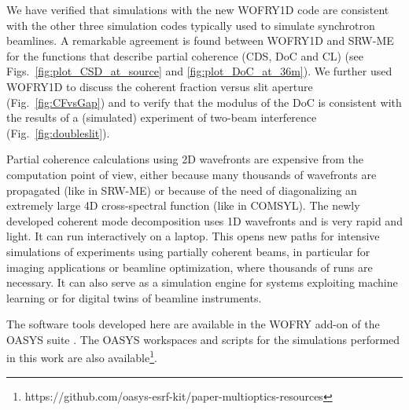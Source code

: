 \documentclass{iucr}
\newcommand{\inblue}[1]{{\color{blue}#1}}
\begin{document}
We have verified that simulations with the new WOFRY1D code are consistent with the other three simulation codes typically used to simulate synchrotron beamlines.
A remarkable agreement is found between WOFRY1D and SRW-ME for the functions that describe partial coherence (CDS, DoC and CL) (see Figs.~\ref{fig:plot_CSD_at_source} and \ref{fig:plot_DoC_at_36m}).
We further used WOFRY1D to discuss the coherent fraction versus slit aperture (\inblue{Fig.~\ref{fig:CFvsGap}}) and to verify that the modulus of the DoC is consistent with the results of a (simulated) experiment of two-beam interference (\inblue{Fig.~\ref{fig:doubleslit}}). 
 
Partial coherence calculations using 2D wavefronts are expensive from the computation point of view, either because many thousands of wavefronts are propagated (like in SRW-ME) or because of the need of diagonalizing an extremely large 4D cross-spectral function (like in COMSYL). The newly developed coherent mode decomposition uses 1D wavefronts and is very rapid and light. It can run interactively on a laptop. This opens new paths for intensive simulations of experiments using partially coherent beams, in particular for imaging applications or beamline optimization, where thousands of runs are necessary. It can also serve as a simulation engine for systems exploiting machine learning or for digital twins of beamline instruments. 
 
The software tools developed here are available in the WOFRY add-on of the OASYS suite \cite{codeOASYS}. The OASYS workspaces and scripts for the simulations performed in this work are also available\footnote{{ https://github.com/oasys-esrf-kit/paper-multioptics-resources}}.



\end{document}

